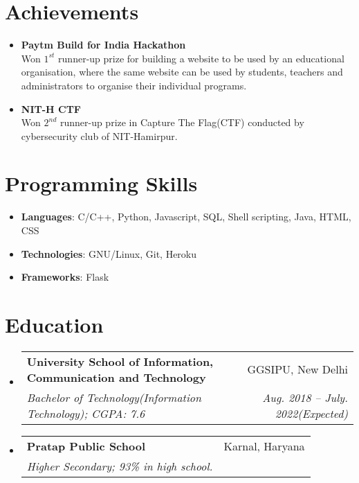 \documentclass[letterpaper,11pt]{article}
\makeatletter
\newcommand{\resumeItem}[2]{
  \item\small{
    \textbf{#1}{#2 \vspace{-2pt}}
  }
}
\newcommand{\resumeSubheadingEdu}[4]{
  \vspace{-1pt}\item
    \begin{tabular*}{0.97\textwidth}[t]{l@{\extracolsep{\fill}}r}
      \textbf{#1} & #2 \\
      \textit{\small#3} & \textit{\small #4} \\
    \end{tabular*}\vspace{-5pt}
}
\newcommand{\resumeSubItem}[2]{\resumeItem{#1}{#2}\vspace{-4pt}}
\newcommand{\resumeSubHeadingListStart}{\begin{itemize}[leftmargin=*]}
\newcommand{\resumeSubHeadingListEnd}{\end{itemize}}
\makeatother
\begin{document}
\section{Achievements}
  \resumeSubHeadingListStart
    \resumeSubItem{Paytm Build for India Hackathon}\\  
	\vspace{9pt}
	{Won $1^{st}$ runner-up prize for building a website to be used by an educational organisation, where the same website can be used by students, teachers and administrators to organise their individual programs.}
   \resumeSubItem{NIT-H CTF}\\  
	\vspace{9pt}
	{Won $2^{nd}$ runner-up prize in Capture The Flag(CTF) conducted by cybersecurity club of NIT-Hamirpur.}
  \resumeSubHeadingListEnd


\section{Programming Skills}
    \begin{itemize}[leftmargin=*]
    \setlength{\itemsep}{0pt}
    \item{
      \textbf{Languages}{: C/C++, Python, Javascript, SQL, Shell scripting, Java, HTML, CSS}}
    \item{
      \textbf{Technologies}{: GNU/Linux, Git, Heroku}}
    \item{
      \textbf{Frameworks}{: Flask}}
  
    \end{itemize}

\section{Education}
  \resumeSubHeadingListStart
    \resumeSubheadingEdu
      {University School of Information, Communication and Technology}{GGSIPU, New Delhi}
      {Bachelor of Technology(Information Technology);  CGPA: 7.6}{Aug. 2018 -- July. 2022(Expected)}
    \resumeSubheadingEdu
      {Pratap Public School}{Karnal, Haryana}
      {Higher Secondary; 93\% in high school.}{}
  \resumeSubHeadingListEnd





\end{document}
